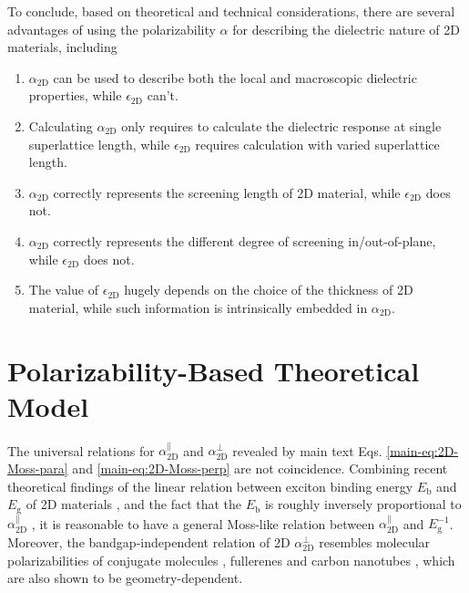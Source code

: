 \documentclass[manuscript=suppinfo,email=true,hyperref=true,keywords=false]{achemso}
\begin{document}
To conclude, based on theoretical and technical considerations, there are several
advantages of using the polarizability $\alpha$ for describing the dielectric
nature of 2D materials, including
\begin{enumerate}
\item $\alpha_{\mathrm{2D}}$ can be used to describe both the local and macroscopic dielectric properties, while $\epsilon_{\mathrm{2D}}$ can't.
\item Calculating $\alpha_{\mathrm{2D}}$ only requires to calculate the dielectric response at single superlattice length, while $\epsilon_{\mathrm{2D}}$ requires calculation with varied superlattice length.
\item $\alpha_{\mathrm{2D}}$ correctly represents the screening length of 2D material, while $\epsilon_{\mathrm{2D}}$ does not.
\item $\alpha_{\mathrm{2D}}$ correctly represents the different degree of screening in/out-of-plane, while $\epsilon_{\mathrm{2D}}$ does not.
  
\item The value of $\epsilon_{\mathrm{2D}}$ hugely depends on the
  choice of the thickness of 2D material, while such information is
  intrinsically embedded in $\alpha_{\mathrm{2D}}$.
\end{enumerate}


\section{Polarizability-Based Theoretical Model}
\label{ssec:theory-1}
The universal relations for $\alpha_{\mathrm{2D}}^{\parallel}$ and
$\alpha_{\mathrm{2D}}^{\perp}$ revealed by main text
Eqs. \ref{main-eq:2D-Moss-para} and \ref{main-eq:2D-Moss-perp} are not
coincidence. Combining recent theoretical findings of the linear
relation between exciton binding energy $E_{\mathrm{b}}$ and
$E_{\mathrm{g}}$ of 2D materials
\cite{Choi_linear_2015,Olsen_2016_hydrogen,Jiang_2017_Eg_Eb}, and the
fact that the $E_{\mathrm{b}}$ is roughly inversely proportional to
$\alpha_{\mathrm{2D}}^{\parallel}$ \cite{Pulci_2014}, it is reasonable
to have a general Moss-like relation between
$\alpha_{\mathrm{2D}}^{\parallel}$ and $E_{\mathrm{g}}^{-1}$. Moreover,
the bandgap-independent relation of 2D $\alpha_{\mathrm{2D}}^{\perp}$
resembles molecular polarizabilities of conjugate molecules
\cite{Davies_1952}, fullerenes \cite{Sabirov_2014} and carbon
nanotubes \cite{Benedict_1995}, which are also shown to be
geometry-dependent.
\end{document}
